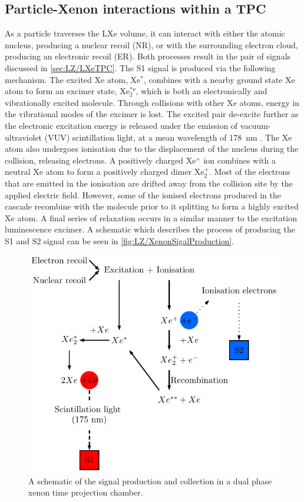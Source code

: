 \subsection{Particle-Xenon interactions within a TPC}\label{sec:LZ/XeInteractionsTPC}
As a particle traverses the LXe volume, it can interact with either the atomic nucleus, producing a nuclear recoil (NR), or with the surrounding electron cloud, producing an electronic recoil (ER). Both processes result in the pair of signals discussed in \autoref{sec:LZ/LXeTPC}. The S1 signal is produced via the following mechanism. The excited Xe atom, Xe$^{*}$, combines with a nearby ground state Xe atom to form an excimer state, Xe$_{2}^{*\nu}$, which is both an electronically and vibrationally excited molecule. Through collisions with other Xe atoms, energy in the vibrational modes of the excimer is lost. The excited pair de-excite further as the electronic excitation energy is released under the emission of vacuum-ultraviolet (VUV) scintillation light, at a mean wavelength of 178~nm \cite{Schumann:2014uva}.
The Xe atom also undergoes ionisation due to the displacement of the nucleus during the collision, releasing electrons. A positively charged Xe$^{+}$ ion combines with a neutral Xe atom to form a positively charged dimer Xe$^{+}_{2}$. Most of the electrons that are emitted in the ionisation are drifted away from the collision site by the applied electric field. However, some of the ionised electrons produced in the cascade recombine with the molecule prior to it splitting to form a highly excited Xe atom. A final series of relaxation occurs in a similar manner to the excitation luminescence excimer. A schematic which describes the process of producing the S1 and S2 signal can be seen in \autoref{fig:LZ/XenonSigalProduction}.
\begin{figure}[!ht]
    \centering
    \includegraphics[width=0.7\linewidth]{figures/LZ/Xenon_interaction.pdf}
    \caption[A schematic of the signal production and collection in a dual phase xenon TPC.]{A schematic of the signal production and collection in a dual phase xenon time projection chamber.}
    \label{fig:LZ/XenonSigalProduction}
\end{figure}
